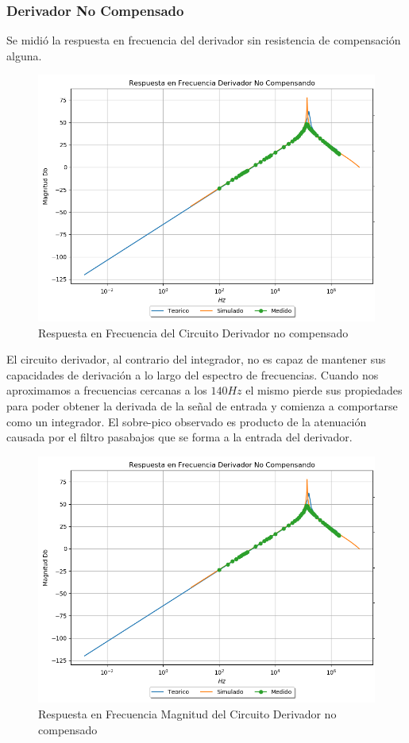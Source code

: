 \subsubsection{Derivador No Compensado}
Se midió la respuesta en frecuencia del derivador sin resistencia de compensación alguna.
\begin{figure}[H]
	\centering
	\includegraphics[width=\textwidth]{Ejercicio4/SUPERPOSICION-BODE-DERIVADOR-NO-COMPENSADO}
	\caption{Respuesta en Frecuencia del Circuito Derivador no compensado}
\end{figure}
El circuito derivador, al contrario del integrador, no es capaz de mantener sus capacidades de derivación a lo largo del espectro de frecuencias. Cuando nos aproximamos a frecuencias cercanas a los $140Hz$ el mismo pierde sus propiedades para poder obtener la derivada de la señal de entrada y comienza a comportarse como un integrador. 
El sobre-pico observado es producto de la atenuación causada por el filtro pasabajos que se forma a la entrada del derivador.


\begin{figure}[H]
	\centering
	\includegraphics[width=\textwidth]{Ejercicio4/SUPERPOSICION-BODE-DERIVADOR-NO-COMPENSADO}
	\caption{Respuesta en Frecuencia Magnitud del Circuito Derivador no compensado}
\end{figure}

